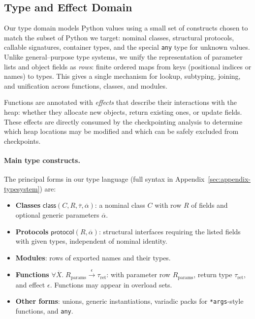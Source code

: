 \subsection{Type and Effect Domain}

Our type domain models Python values using a small set of constructs chosen to match the subset of Python we target: nominal classes, structural protocols, callable signatures, container types, and the special \texttt{any} type for unknown values.
Unlike general--purpose type systems, we unify the representation of parameter lists and object fields as \emph{rows}: finite ordered maps from keys (positional indices or names) to types.  
This gives a single mechanism for lookup, subtyping, joining, and unification across functions, classes, and modules.

Functions are annotated with \emph{effects} that describe their interactions with the heap: whether they allocate new objects, return existing ones, or update fields.  
These effects are directly consumed by the checkpointing analysis to determine which heap locations may be modified and which can be safely excluded from checkpoints.

\paragraph{Main type constructs.}
The principal forms in our type language (full syntax in Appendix~\ref{sec:appendix-typesystem}) are:
\begin{itemize}
  \item \textbf{Classes} $\mathsf{class}(C, R, \overline{\tau}, \overline{\alpha})$:
        a nominal class $C$ with row $R$ of fields and optional generic parameters $\overline{\alpha}$.
  \item \textbf{Protocols} $\mathsf{protocol}(R, \overline{\alpha})$:
        structural interfaces requiring the listed fields with given types, independent of nominal identity.
  \item \textbf{Modules}:
        rows of exported names and their types.
  \item \textbf{Functions} $\forall \overline{X}.\;R_{\mathrm{params}} \xrightarrow{\epsilon} \tau_{\mathrm{ret}}$:
        with parameter row $R_{\mathrm{params}}$, return type $\tau_{\mathrm{ret}}$, and effect $\epsilon$.
        Functions may appear in overload sets.
  \item \textbf{Other forms}:
        unions, generic instantiations, variadic packs for \texttt{*args}-style functions, and \texttt{any}.
\end{itemize}

